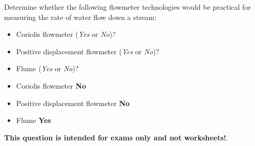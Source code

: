 

Determine whether the following flowmeter technologies would be practical for measuring the rate of water flow down a stream:

\begin{itemize}
\item{} Coriolis flowmeter ({\it Yes} or {\it No})?
\vskip 10pt
\item{} Positive displacement flowmeter ({\it Yes} or {\it No})?
\vskip 10pt
\item{} Flume ({\it Yes} or {\it No})?
\end{itemize}







\begin{itemize}
\item{} Coriolis flowmeter {\bf No}
\item{} Positive displacement flowmeter {\bf No}
\item{} Flume {\bf Yes}
\end{itemize}







{\bf This question is intended for exams only and not worksheets!}.



